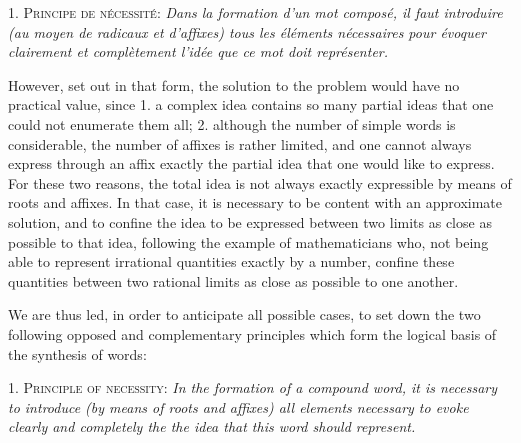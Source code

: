 \begin{sloppypar}
{  1. \textsc{Principe de nécessité}: \emph{Dans la formation d’un mot
    composé, il faut introduire (au moyen de radicaux et d'affixes)
    tous les éléments nécessaires pour évoquer clairement et
    complètement l'idée que ce mot doit représenter.}

}
%
{However, set out in that form, the solution to the problem would have
  no practical value, since 1. a complex idea contains so many partial
  ideas that one could not enumerate them all; 2. although the number
  of simple words is considerable, the number of affixes is rather
  limited, and one cannot always express through an affix exactly the
  partial idea that one would like to express. For these two reasons,
  the total idea is not always exactly expressible by means of roots
  and affixes. In that case, it is necessary to be content with an
  approximate solution, and to confine the idea to be expressed
  between two limits as close as possible to that idea, following the
  example of mathematicians who, not being able to represent
  irrational quantities exactly by a number, confine these quantities
  between two rational limits as close as possible to one another.

  We are thus led, in order to anticipate all possible cases, to set
  down the two following opposed and complementary principles which
  form the logical basis of the synthesis of words:

  1. \textsc{Principle of necessity}: \emph{In the formation of a
    compound word, it is necessary to introduce (by means of roots and
    affixes) all elements necessary to evoke clearly and completely
    the the idea that this word should represent.}

}

\end{sloppypar}
